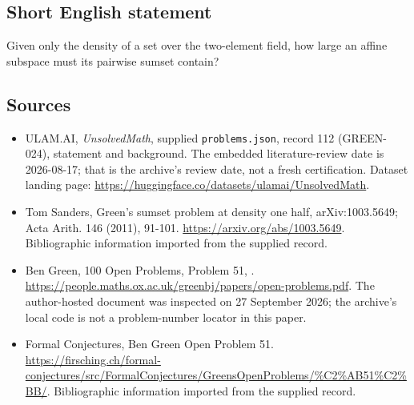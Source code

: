 \documentclass[11pt,a4paper]{article}
\begin{document}
\subsection{Short English statement}

Given only the density of a set over the two-element field, how large an affine subspace must its pairwise sumset contain?

\subsection{Sources}

{\small

\begin{itemize}

\item[\hypertarget{source:112:1}{S1}] ULAM.AI, \emph{UnsolvedMath}, supplied \texttt{problems.json}, record 112 (GREEN-024), statement and background. The embedded literature-review date is 2026-08-17; that is the archive’s review date, not a fresh certification. Dataset landing page: \url{https://huggingface.co/datasets/ulamai/UnsolvedMath}.

\item[\hypertarget{source:112:2}{S2}] Tom Sanders, Green's sumset problem at density one half, arXiv:1003.5649; Acta Arith. 146 (2011), 91-101. \url{https://arxiv.org/abs/1003.5649}. Bibliographic information imported from the supplied record.

\item[\hypertarget{source:112:3}{S3}] Ben Green, 100 Open Problems, Problem 51, . \url{https://people.maths.ox.ac.uk/greenbj/papers/open-problems.pdf}. The author-hosted document was inspected on 27 September 2026; the archive’s local code is not a problem-number locator in this paper.

\item[\hypertarget{source:112:4}{S4}] Formal Conjectures, Ben Green Open Problem 51. \url{https://firsching.ch/formal-conjectures/src/FormalConjectures/GreensOpenProblems/%C2%AB51%C2%BB/}. Bibliographic information imported from the supplied record.

\end{itemize}

}

\label{end:112}
\end{document}
